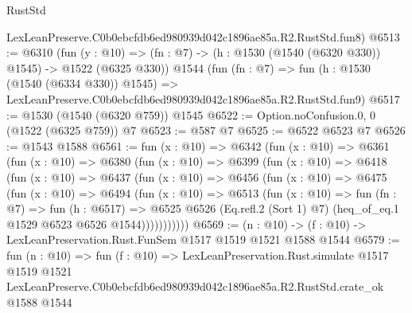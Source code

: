 \begin{lexlean}{RustStd}
\begin{coremodule}
    LexLeanPreserve.C0b0ebcfdb6ed980939d042c1896ae85a.R2.RustStd.fun8)
@6513 := @6310
    (fun (y : @10) => (fn : @7) -> (h : @1530 (@1540 (@6320 @330)) @1545) -> @1522 (@6325 @330))
    @1544
    (fun (fn : @7) =>
    fun (h : @1530 (@1540 (@6334 @330)) @1545) =>
    LexLeanPreserve.C0b0ebcfdb6ed980939d042c1896ae85a.R2.RustStd.fun9)
@6517 := @1530 (@1540 (@6320 @759)) @1545
@6522 := Option.noConfusion.{0, 0} (@1522 (@6325 @759)) @7
@6523 := @587 @7
@6525 := @6522 @6523 @7
@6526 := @1543 @1588
@6561 := fun (x : @10) =>
  @6342
    (fun (x : @10) =>
    @6361
      (fun (x : @10) =>
      @6380
        (fun (x : @10) =>
        @6399
          (fun (x : @10) =>
          @6418
            (fun (x : @10) =>
            @6437
              (fun (x : @10) =>
              @6456
                (fun (x : @10) =>
                @6475
                  (fun (x : @10) =>
                  @6494
                    (fun (x : @10) =>
                    @6513
                      (fun (x : @10) =>
                      fun (fn : @7) =>
                      fun (h : @6517) =>
                      @6525
                        @6526
                        (Eq.refl.{2} (Sort 1) @7)
                        (heq_of_eq.{1} @1529 @6523 @6526 @1544)))))))))))
@6569 := (n : @10) -> (f : @10) -> LexLeanPreservation.Rust.FunSem @1517 @1519 @1521 @1588 @1544
@6579 := fun (n : @10) =>
  fun (f : @10) =>
  LexLeanPreservation.Rust.simulate
    @1517
    @1519
    @1521
    LexLeanPreserve.C0b0ebcfdb6ed980939d042c1896ae85a.R2.RustStd.crate_ok
    @1588
    @1544
\end{coremodule}
\end{lexlean}
